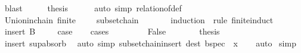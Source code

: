 \begin{isabellebody}
\ blast\isanewline
\ \ \isamarkupfalse%
\ \isamarkupfalse%
\ {\isacharquery}{\kern0pt}thesis\isanewline
\ \ \ \ \isamarkupfalse%
\ {\isacharparenleft}{\kern0pt}auto\ simp{\isacharcolon}{\kern0pt}\ relation{\isacharunderscore}{\kern0pt}of{\isacharunderscore}{\kern0pt}def{\isacharparenright}{\kern0pt}\isanewline
{}\isamarkupfalse%
%
\endisatagproof
{\isafoldproof}%
%
\isadelimproof
\isanewline
%
\endisadelimproof
\isanewline
{}\isamarkupfalse%
\ Union{\isacharunderscore}{\kern0pt}in{\isacharunderscore}{\kern0pt}chain{\isacharcolon}{\kern0pt}\ {\isachardoublequoteopen}{\isasymlbrakk}finite\ {\isasymB}{\isacharsemicolon}{\kern0pt}\ {\isasymB}\ {\isasymnoteq}\ {\isacharbraceleft}{\kern0pt}{\isacharbraceright}{\kern0pt}{\isacharsemicolon}{\kern0pt}\ subset{\isachardot}{\kern0pt}chain\ {\isasymA}\ {\isasymB}{\isasymrbrakk}\ {\isasymLongrightarrow}\ {\isasymUnion}{\isasymB}\ {\isasymin}\ {\isasymB}{\isachardoublequoteclose}\isanewline
%
\isadelimproof
%
\endisadelimproof
%
\isatagproof
{}\isamarkupfalse%
\ {\isacharparenleft}{\kern0pt}induction\ {\isasymB}\ rule{\isacharcolon}{\kern0pt}\ finite{\isacharunderscore}{\kern0pt}induct{\isacharparenright}{\kern0pt}\isanewline
\ \ \isamarkupfalse%
\ {\isacharparenleft}{\kern0pt}insert\ B\ {\isasymB}{\isacharparenright}{\kern0pt}\isanewline
\ \ \isamarkupfalse%
\ {\isacharquery}{\kern0pt}case\isanewline
\ \ \isamarkupfalse%
\ {\isacharparenleft}{\kern0pt}cases\ {\isachardoublequoteopen}{\isasymB}\ {\isacharequal}{\kern0pt}\ {\isacharbraceleft}{\kern0pt}{\isacharbraceright}{\kern0pt}{\isachardoublequoteclose}{\isacharparenright}{\kern0pt}\isanewline
\ \ \ \ \isamarkupfalse%
\ False\isanewline
\ \ \ \ \isamarkupfalse%
\ \isamarkupfalse%
\ {\isacharquery}{\kern0pt}thesis\isanewline
\ \ \ \ \ \ \isamarkupfalse%
\ insert\ sup{\isachardot}{\kern0pt}absorb{}\ \isamarkupfalse%
\ {\isacharparenleft}{\kern0pt}auto\ simp{\isacharcolon}{\kern0pt}\ subset{\isacharunderscore}{\kern0pt}chain{\isacharunderscore}{\kern0pt}insert\ dest{\isacharbang}{\kern0pt}{\isacharcolon}{\kern0pt}\ bspec\ {\isacharbrackleft}{\kern0pt}\ x{\isacharequal}{\kern0pt}{\isachardoublequoteopen}{\isasymUnion}{\isasymB}{\isachardoublequoteclose}{\isacharbrackright}{\kern0pt}{\isacharparenright}{\kern0pt}\isanewline
\ \ \isamarkupfalse%
\ auto\isanewline
{}\isamarkupfalse%
\ simp%

\end{isabellebody}
